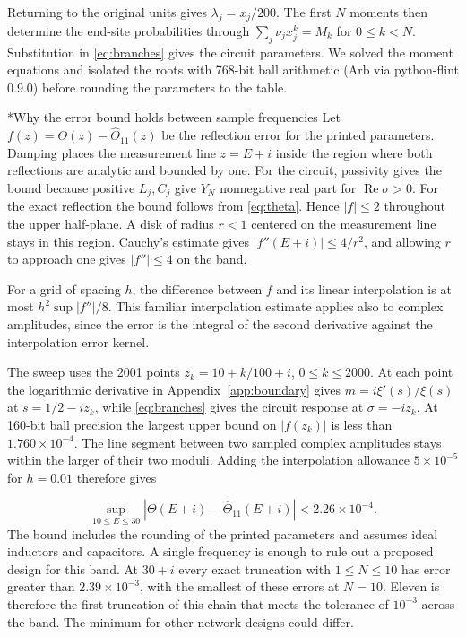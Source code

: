 \documentclass[11pt,letterpaper]{article}
\makeatletter
\renewcommand\subsection{\@startsection{subsection}{2}{\z@}{-2.0ex plus -.3ex}{.75ex}{\normalfont\normalsize\itshape}}
\numberwithin{equation}{section}
\makeatother
\begin{document}
Returning to the original units gives $\lambda_j=x_j/200$. The first $N$ moments then determine the end-site probabilities through $\sum_j\nu_j x_j^k=M_k$ for $0\le k<N$. Substitution in \eqref{eq:branches} gives the circuit parameters. We solved the moment equations and isolated the roots with 768-bit ball arithmetic (Arb via python-flint 0.9.0) before rounding the parameters to the table.

\subsection*{Why the error bound holds between sample frequencies}
Let $f(z)=\Theta(z)-\widehat\Theta_{11}(z)$ be the reflection error for the printed parameters. Damping places the measurement line $z=E+i$ inside the region where both reflections are analytic and bounded by one. For the circuit, passivity gives the bound because positive $L_j,C_j$ give $Y_N$ nonnegative real part for $\operatorname{Re}\sigma>0$. For the exact reflection the bound follows from \eqref{eq:theta}. Hence $|f|\le2$ throughout the upper half-plane. A disk of radius $r<1$ centered on the measurement line stays in this region. Cauchy's estimate gives $|f''(E+i)|\le 4/r^2$, and allowing $r$ to approach one gives $|f''|\le4$ on the band.

For a grid of spacing $h$, the difference between $f$ and its linear interpolation is at most $h^2\sup |f''|/8$. This familiar interpolation estimate applies also to complex amplitudes, since the error is the integral of the second derivative against the interpolation error kernel.

The sweep uses the 2001 points $z_k=10+k/100+i$, $0\le k\le2000$. At each point the logarithmic derivative in Appendix~\ref{app:boundary} gives $m=i\xi'(s)/\xi(s)$ at $s=1/2-iz_k$, while \eqref{eq:branches} gives the circuit response at $\sigma=-iz_k$. At 160-bit ball precision the largest upper bound on $|f(z_k)|$ is less than $1.760\times10^{-4}$. The line segment between two sampled complex amplitudes stays within the larger of their two moduli. Adding the interpolation allowance $5\times10^{-5}$ for $h=0.01$ therefore gives

\[
 \sup_{10\le E\le30}|\Theta(E+i)-\widehat\Theta_{11}(E+i)|
 <2.26\times10^{-4}.
\]
The bound includes the rounding of the printed parameters and assumes ideal inductors and capacitors. A single frequency is enough to rule out a proposed design for this band. At $30+i$ every exact truncation with $1\le N\le10$ has error greater than $2.39\times10^{-3}$, with the smallest of these errors at $N=10$. Eleven is therefore the first truncation of this chain that meets the tolerance of $10^{-3}$ across the band. The minimum for other network designs could differ.
\end{document}
